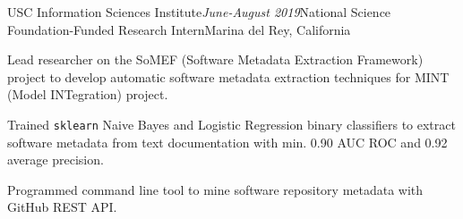 \begin{rSubsection}{USC Information Sciences Institute}{\em June-August 2019}{National Science Foundation-Funded Research Intern}{Marina del Rey, California}
\item Lead researcher on the SoMEF (Software Metadata Extraction Framework) project to develop automatic software metadata extraction techniques for MINT (Model INTegration) project.
\item Trained \texttt{sklearn} Naive Bayes and Logistic Regression binary classifiers to extract software metadata from text documentation with min. 0.90 AUC ROC and 0.92 average precision.
\item Programmed command line tool to mine software repository metadata with GitHub REST API. 
\end{rSubsection}